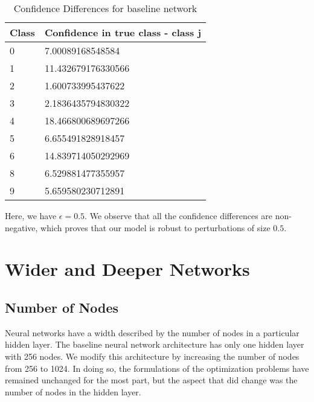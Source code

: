 \documentclass{article}
\begin{document}
\begin{table}[h]
\centering
\begin{tabular}{|l|l|}
\hline
Class & Confidence in true class - class j \\ \hline
0     & 7.00089168548584                   \\ \hline
1     & 11.432679176330566                 \\ \hline
2     & 1.600733995437622                  \\ \hline
3     & 2.1836435794830322                 \\ \hline
4     & 18.466800689697266                 \\ \hline
5     & 6.655491828918457                  \\ \hline
6     & 14.839714050292969                 \\ \hline
8     & 6.529881477355957                  \\ \hline
9     & 5.659580230712891                  \\ \hline
\end{tabular}
\caption{Confidence Differences for baseline network}
\end{table}

Here, we have $\epsilon = 0.5$. We observe that all the confidence differences are non-negative,
which proves that our model is robust to perturbations of size $0.5$.


\section{Wider and Deeper Networks}

\subsection{Number of Nodes}

Neural networks have a width described by the number of nodes in a particular hidden layer. The 
baseline neural network architecture has only one hidden layer with 256 nodes. We modify this
architecture by increasing the number of nodes from 256 to 1024. In doing so, the formulations
of the optimization problems have remained unchanged for the most part, but the aspect that did 
change was the number of nodes in the hidden layer. 
\end{document}
